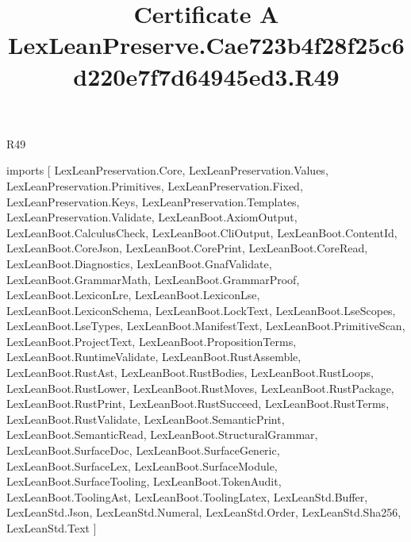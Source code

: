 \begin{lexlean}{R49}
\title{Certificate A LexLeanPreserve.Cae723b4f28f25c6d220e7f7d64945ed3.R49}
\begin{coremodule}
imports [
  LexLeanPreservation.Core,
  LexLeanPreservation.Values,
  LexLeanPreservation.Primitives,
  LexLeanPreservation.Fixed,
  LexLeanPreservation.Keys,
  LexLeanPreservation.Templates,
  LexLeanPreservation.Validate,
  LexLeanBoot.AxiomOutput,
  LexLeanBoot.CalculusCheck,
  LexLeanBoot.CliOutput,
  LexLeanBoot.ContentId,
  LexLeanBoot.CoreJson,
  LexLeanBoot.CorePrint,
  LexLeanBoot.CoreRead,
  LexLeanBoot.Diagnostics,
  LexLeanBoot.GnafValidate,
  LexLeanBoot.GrammarMath,
  LexLeanBoot.GrammarProof,
  LexLeanBoot.LexiconLre,
  LexLeanBoot.LexiconLse,
  LexLeanBoot.LexiconSchema,
  LexLeanBoot.LockText,
  LexLeanBoot.LseScopes,
  LexLeanBoot.LseTypes,
  LexLeanBoot.ManifestText,
  LexLeanBoot.PrimitiveScan,
  LexLeanBoot.ProjectText,
  LexLeanBoot.PropositionTerms,
  LexLeanBoot.RuntimeValidate,
  LexLeanBoot.RustAssemble,
  LexLeanBoot.RustAst,
  LexLeanBoot.RustBodies,
  LexLeanBoot.RustLoops,
  LexLeanBoot.RustLower,
  LexLeanBoot.RustMoves,
  LexLeanBoot.RustPackage,
  LexLeanBoot.RustPrint,
  LexLeanBoot.RustSucceed,
  LexLeanBoot.RustTerms,
  LexLeanBoot.RustValidate,
  LexLeanBoot.SemanticPrint,
  LexLeanBoot.SemanticRead,
  LexLeanBoot.StructuralGrammar,
  LexLeanBoot.SurfaceDoc,
  LexLeanBoot.SurfaceGeneric,
  LexLeanBoot.SurfaceLex,
  LexLeanBoot.SurfaceModule,
  LexLeanBoot.SurfaceTooling,
  LexLeanBoot.TokenAudit,
  LexLeanBoot.ToolingAst,
  LexLeanBoot.ToolingLatex,
  LexLeanStd.Buffer,
  LexLeanStd.Json,
  LexLeanStd.Numeral,
  LexLeanStd.Order,
  LexLeanStd.Sha256,
  LexLeanStd.Text
]


\end{coremodule}
\end{lexlean}
